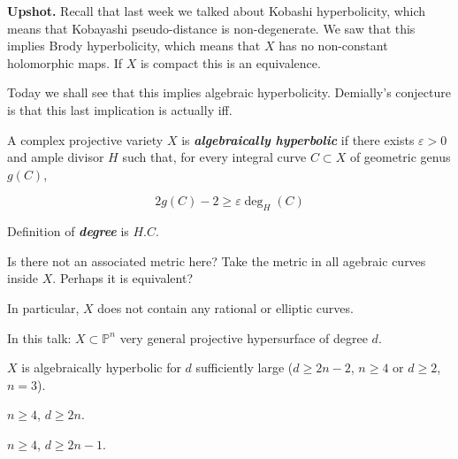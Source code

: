 \medskip\noindent
{\bf Upshot.} Recall that last week we talked
about Kobashi hyperbolicity, which means that
Kobayashi pseudo-distance is non-degenerate.
We saw that this implies Brody hyperbolicity,
which means that $X$ has no non-constant
holomorphic maps. If $X$ is compact this is
an equivalence.

Today we shall see that this implies
algebraic hyperbolicity. Demially's
conjecture is that this last implication is
actually iff.

\begin{definition}
\label{definition-mioranci-1}
A complex projective variety $X$ is
\textit{\textbf{algebraically hyperbolic}} if
there exists $\varepsilon>0$ and ample
divisor $H$ such that, for every integral
curve $C \subset X$ of geometric genus
$g(C)$,

$$
2g(C)-2 \geq \varepsilon
\operatorname{deg}_H(C)
$$

\end{definition}

\begin{remark}[Vitorio]
\label{remark-mioranci-1}
Definition of \textit{\textbf{degree}} is
$H.C$.
\end{remark}

\begin{remark}[Misha]
\label{remark-mioranci-2}
Is there not an associated metric here? Take
the metric in all agebraic curves inside $X$.
Perhaps it is equivalent?
\end{remark}

\begin{remark}
\label{remark-mioranci-3}
In particular, $X$ does not contain any
rational or elliptic curves.
\end{remark}

In this talk: $X \subset \mathbb{P}^n$ very
general projective hypersurface of degree
$d$.

\medskip{} $X$ is algebraically hyperbolic
for $d$ sufficiently large ($d\geq 2n-2$,
$n\geq 4$ or $d\geq 2$, $n=3$).

\medskip{}

\begin{theorem}[Clemens '86, E. '88]
\label{theorem-mioranci-1}
$n \geq  4$, $d\geq 2n$.
\end{theorem}

\begin{theorem}[Voisin, '96, 98]
\label{theorem-mioranci-2}
$n \geq 4$, $d \geq  2n-1$.
\end{theorem}

